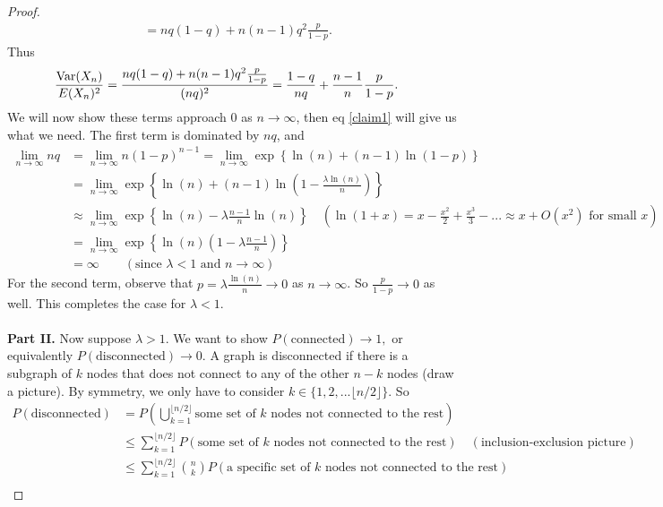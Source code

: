 \documentclass[./some_latex_template.tex]{subfiles}
\begin{document}
\begin{proof}
\begin{align*}
	&= nq(1-q) + n(n-1)q^2\frac{p}{1-p}.
\end{align*}
Thus 
\begin{align*}
	\frac{\mathop{\rm Var}\nolimits(X_n)}{E(X_n)^2} 
	&= \frac{nq(1-q) + n(n-1)q^2\frac{p}{1-p}}{(nq)^2} = \frac{1-q}{nq} + \frac{n-1}{n}\frac{p}{1-p}.
\end{align*}
We will now show these terms approach 0 as $n \rightarrow \infty$, then eq \eqref{claim1} will give us what we need.
The first term is dominated by $nq$, and
\begin{align*}
	\lim_{n \rightarrow \infty} nq 
	&= \lim_{n \rightarrow \infty} n(1-p)^{n-1} = \lim_{n \rightarrow \infty}  \exp \left\{ \ln(n) + (n-1)\ln(1 - p) \right\}\\
	&= \lim_{n \rightarrow \infty} \exp \left\{ \ln(n) + (n-1)\ln\left( 1 - \frac{\lambda \ln(n)}{n} \right) \right\}\\
	&\approx \lim_{n \rightarrow \infty} \exp \left\{ \ln(n) - \lambda\frac{n-1}{n}\ln(n) \right\} \quad \left(\ln(1 + x) = x - \frac{x^2}{2} + \frac{x^3}{3} -... \approx x + O(x^2) \text{ for small }x\right)\\
	&= \lim_{n \rightarrow \infty} \exp \left\{ \ln(n)\left( 1 - \lambda\frac{n-1}{n} \right) \right\}\\
	&= \infty \qquad \left(\text{since } \lambda < 1 \text{ and } n \rightarrow \infty \right)
\end{align*}
For the second term, observe that $p = \lambda \frac{\ln(n)}{n} \rightarrow 0$ as $n \rightarrow \infty$. So $\frac{p}{1-p} \rightarrow 0$ as well. This completes the case for $\lambda < 1$. \\
\\
\textbf{Part II.} Now suppose $\lambda > 1$. We want to show $P(\text{connected})\rightarrow 1,$ or equivalently $P(\text{disconnected})\rightarrow 0$. A graph is disconnected if there is a subgraph of $k$ nodes that does not connect to any of the other $n - k$ nodes (draw a picture). By symmetry, we only have to consider $k \in \{1, 2, ... \lfloor n/2 \rfloor\}$.  So 
\begin{align*}
	P(\text{disconnected}) 
	&= P\left(\bigcup_{k=1}^{\lfloor n/2 \rfloor}  \text{some set of } k \text{ nodes not connected to the rest}\right)\\
	&\le \sum_{k=1}^{\lfloor n/2 \rfloor} P(\text{some set of } k \text{ nodes not connected to the rest}) \quad (\text{inclusion-exclusion picture})\\
	&\le \sum_{k=1}^{\lfloor n/2 \rfloor} {n \choose k} P(\text{a specific set of } k \text{ nodes not connected to the rest})\\

\end{align*}
\end{proof}
\end{document}
